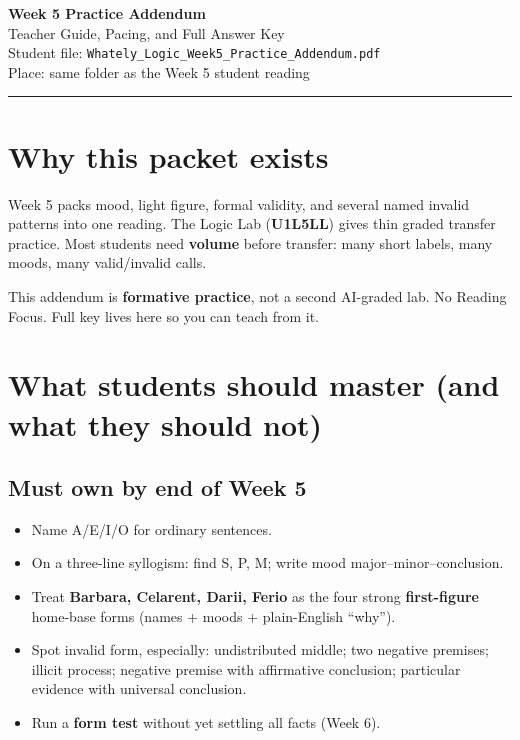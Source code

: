 \documentclass[11pt]{article}
\begin{document}
\begin{center}
{\LARGE\bfseries Week 5 Practice Addendum}\\[0.2em]
{\large Teacher Guide, Pacing, and Full Answer Key}\\[0.25em]
{\small Student file: \texttt{Whately\_Logic\_Week5\_Practice\_Addendum.pdf}}\\[0.1em]
{\small Place: same folder as the Week 5 student reading}\\[0.15em]
\rule{0.85\textwidth}{0.5pt}
\end{center}

\section{Why this packet exists}
Week 5 packs mood, light figure, formal validity, and several named invalid patterns into one reading. The Logic Lab (\textbf{U1L5LL}) gives thin graded transfer practice. Most students need \textbf{volume} before transfer: many short labels, many moods, many valid/invalid calls.

This addendum is \textbf{formative practice}, not a second AI-graded lab. No Reading Focus. Full key lives here so you can teach from it.

\section{What students should master (and what they should not)}
\subsection*{Must own by end of Week 5}
\begin{itemize}
\item Name A/E/I/O for ordinary sentences.
\item On a three-line syllogism: find S, P, M; write mood major--minor--conclusion.
\item Treat \textbf{Barbara, Celarent, Darii, Ferio} as the four strong \textbf{first-figure} home-base forms (names + moods + plain-English ``why'').
\item Spot invalid form, especially: undistributed middle; two negative premises; illicit process; negative premise with affirmative conclusion; particular evidence with universal conclusion.
\item Run a \textbf{form test} without yet settling all facts (Week 6).
\end{itemize}
\end{document}
